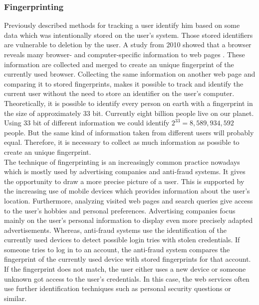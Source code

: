 \subsubsection{Fingerprinting}

	Previously described methods for tracking a user identify him based on some data which was intentionally stored on the user's system. Those stored identifiers are vulnerable to deletion by the user. A study from 2010 showed that a browser reveals many browser- and computer-specific information to web pages \cite{Eckersley:2010:UYW:1881151.1881152}. These information are collected and merged to create an unique fingerprint of the currently used browser. Collecting the same information on another web page and comparing it to stored fingerprints, makes it possible to track and identify the current user without the need to store an identifier on the user's computer. Theoretically, it is possible to identify every person on earth with a fingerprint in the size of approximately 33 bit. Currently eight billion people live on our planet. Using 33 bit of different information we could identify $2^{33}=8,589,934,592$ people. But the same kind of information taken from different users will probably equal. Therefore, it is necessary to collect as much information as possible to create an unique fingerprint. \\
	
	The technique of fingerprinting is an increasingly common practice nowadays which is mostly used by advertising companies and anti-fraud systems. It gives the opportunity to draw a more precise picture of a user. This is supported by the increasing use of mobile devices which provides information about the user's location. Furthermore, analyzing visited web pages and search queries give access to the user's hobbies and personal preferences. Advertising companies focus mainly on the user's personal information to display even more precisely adapted advertisements. Whereas, anti-fraud systems use the identification of the currently used devices to detect possible login tries with stolen credentials. If someone tries to log in to an account, the anti-fraud system compares the fingerprint of the currently used device with stored fingerprints for that account. If the fingerprint does not match, the user either uses a new device or someone unknown got access to the user's credentials. In this case, the web services often use further identification techniques such as personal security questions or similar. \\
	
